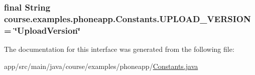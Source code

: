 \subsubsection[{U\+P\+L\+O\+A\+D\+\_\+\+V\+E\+R\+S\+I\+O\+N}]{\setlength{\rightskip}{0pt plus 5cm}final String course.\+examples.\+phoneapp.\+Constants.\+U\+P\+L\+O\+A\+D\+\_\+\+V\+E\+R\+S\+I\+O\+N = \char`\"{}Upload\+Version\char`\"{}\hspace{0.3cm}{\ttfamily [static]}}\label{interfacecourse_1_1examples_1_1phoneapp_1_1_constants_a192096b4b6c461daa7fc205689ce9713}


The documentation for this interface was generated from the following file\+:\begin{DoxyCompactItemize}
\item 
app/src/main/java/course/examples/phoneapp/\hyperlink{_constants_8java}{Constants.\+java}\end{DoxyCompactItemize}
